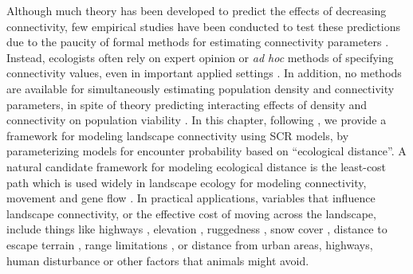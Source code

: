 Although much theory has been developed to
predict the effects of decreasing connectivity, few empirical studies
have been conducted to test these predictions due to the paucity of
formal methods for estimating connectivity parameters
\citep{cushman_etal:2010,hanks_hooten:2012}. Instead, ecologists often rely on expert
opinion or \textit{ad hoc} methods of specifying connectivity values,
even in important applied settings
\citep{adriaensen_etal:2003,beier_etal:2008,zeller_etal:2012}. In
addition, no methods are available for simultaneously estimating
population density and connectivity parameters, in spite of theory
predicting interacting effects of density and connectivity on
population viability \citep{tischendorf_etal:2005,cushman_etal:2010}.
In this chapter, following \citet{royle_etal:2012ecol}, we provide a
framework for modeling landscape connectivity using SCR models, by
parameterizing models for encounter probability based on ``ecological
distance''.  A natural candidate framework for modeling ecological
distance is the least-cost path which is used widely in landscape
ecology for modeling connectivity, movement and gene flow
\citep{adriaensen_etal:2003,manel_etal:2003,mcrae_etal:2008}.  In
practical applications, variables that influence landscape
connectivity, or the effective cost of moving across the landscape,
include things like highways \citep[e.g.,][]{epps_etal:2005},
elevation \citep{cushman_etal:2006}, ruggedness
\citep{epps_etal:2007}, snow cover \citep{schwartz_etal:2009},
distance to escape terrain \citep{shirk_etal:2010}, range limitations
\citep{mcrae_beier:2007}, or distance from urban areas, highways,
human disturbance or other factors that animals might avoid.


